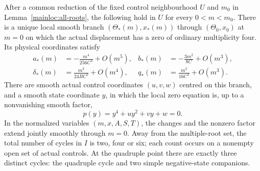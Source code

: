 \begin{theorem}
\label{thm:actual-quartic}
After a common reduction of the fixed control neighbourhood $U$ and
$m_0$ in Lemma~\ref{mainloc:all-roots}, the following hold in $U$
for every $0<m<m_0$. There is a unique local smooth
branch $(\Theta_*(m),x_*(m))$ through $(\Theta_0,x_0)$ at $m=0$
on which the actual displacement has a zero of ordinary multiplicity
four. Its physical coordinates satisfy
\begin{equation}\label{quartic:physical-branch}
 \begin{aligned}
 a_*(m)&=-\frac{m^4}{256C^3}+O(m^5),&
 b_*(m)&=-\frac{3m^2}{8C}+O(m^3),\\
 \delta_*(m)&=\frac{m^3}{24BC^2}+O(m^4),&
 q_*(m)&=\frac{m^2}{16C^2}+O(m^3).
 \end{aligned}
\end{equation}
There are smooth actual control coordinates $(u,v,w)$ centred on
this branch, and a smooth state coordinate $y$, in which the local
zero equation is, up to a nonvanishing smooth factor,
\begin{equation}\label{quartic:preparation}
 p(y)=y^4+uy^2+vy+w=0.
\end{equation}
In the normalized variables $(m,x,A,S,T)$, the changes and the
nonzero factor extend jointly smoothly through $m=0$. Away from the multiple-root set, the total
number of cycles in $I$ is two, four or six; each count occurs on
a nonempty open set of actual controls. At the quadruple point
there are exactly three distinct cycles: the quadruple cycle and
two simple negative-state companions.
\end{theorem}

